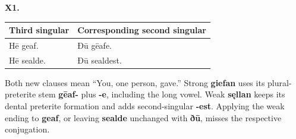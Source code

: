 \par\begin{minipage}{\linewidth}\raggedright
\textbf{X1.}

\par\begingroup
\fontsize{10.5}{13.2}\selectfont
\setlength{\LTleft}{0pt}\setlength{\LTright}{\fill}
\noindent
\begin{tabular}{@{}>{\raggedright\arraybackslash}p{41.96mm}>{\raggedright\arraybackslash}p{79.22mm}@{}}
\toprule
\textbf{Third singular} & \textbf{Corresponding second singular} \\
\midrule
Hē geaf. & Ðū gēafe. \\
Hē sealde. & Ðū sealdest. \\
\bottomrule
\end{tabular}
\par\endgroup

Both new clauses mean “You, one person, gave.” Strong \textbf{giefan} uses its plural-preterite stem \textbf{gēaf-} plus \textbf{-e}, including the long vowel. Weak \textbf{sęllan} keeps its dental preterite formation and adds second-singular \textbf{-est}. Applying the weak ending to \textbf{geaf}, or leaving \textbf{sealde} unchanged with \textbf{ðū}, misses the respective conjugation.

\end{minipage}\par\addvspace{4pt}

